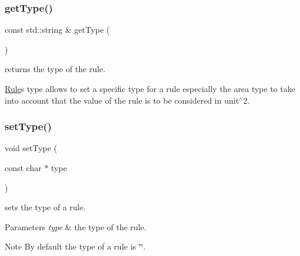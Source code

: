 \subsubsection{\texorpdfstring{get\+Type()}{getType()}}
{\footnotesize\ttfamily const std\+::string \& get\+Type (\begin{DoxyParamCaption}{ }\end{DoxyParamCaption})\hspace{0.3cm}{\ttfamily [inline]}}



returns the type of the rule. 

\mbox{\hyperlink{class_d_t_r_1_1_rule}{Rule}}\textquotesingle{}s type allows to set a specific type for a rule especially the \textquotesingle{}area\textquotesingle{} type to take into account that the value of the rule is to be considered in unit$^\wedge$2. \mbox{\label{class_d_t_r_1_1_rule_a3568407d7a7890c39b8c9acc1e608535}} 
\subsubsection{\texorpdfstring{set\+Type()}{setType()}}
{\footnotesize\ttfamily void set\+Type (\begin{DoxyParamCaption}\item[{const char $\ast$}]{type }\end{DoxyParamCaption})\hspace{0.3cm}{\ttfamily [inline]}}



sets the type of a rule. 


\begin{DoxyParams}{Parameters}
{\em type} & the type of the rule.\\
\hline
\end{DoxyParams}
\begin{DoxyNote}{Note}
By default the type of a rule is \char`\"{}\char`\"{}. 
\end{DoxyNote}
